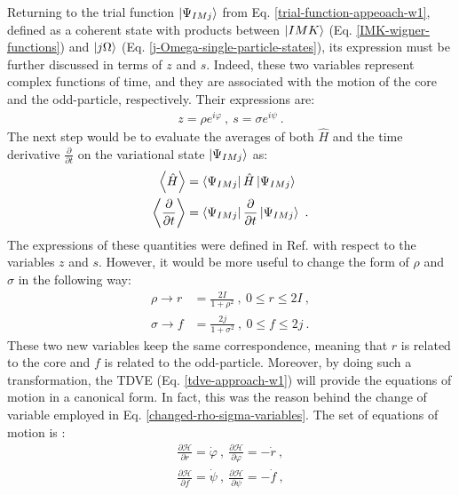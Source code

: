 Returning to the trial function $\ket{\Psi_{IMj}}$ from Eq. \ref{trial-function-appeoach-w1}, defined as a coherent state with products between  $\ket{IMK}$ (Eq. \ref{IMK-wigner-functions}) and $\ket{j\Omega}$ (Eq. \ref{j-Omega-single-particle-states}), its expression must be further discussed in terms of $z$ and $s$. Indeed, these two variables represent complex functions of time, and they are associated with the motion of the core and the odd-particle, respectively. Their expressions are:
\begin{align}
    z=\rho e^{i\varphi}\ ,\ s=\sigma e^{i\psi}\ .
    \label{z-s-variables}
\end{align}
The next step would be to evaluate the averages of both $\hat{H}$ and the time derivative $\frac{\partial}{\partial t}$ on the variational state $\ket{\Psi_{IMj}}$ as:
\begin{align}
    \left\langle \hat{H} \right\rangle&=\bra{\Psi_{IMj}}\hat{H}\ket{\Psi_{IMj}}\nonumber\\
    \left\langle \frac{\partial}{\partial t} \right\rangle&=\bra{\Psi_{IMj}}\frac{\partial}{\partial t}\ket{\Psi_{IMj}}\ .
    \label{hamiltonian-average}
\end{align}
The expressions of these quantities were defined in Ref. \cite{raduta2017semiclassical} with respect to the variables $z$ and $s$. However, it would be more useful to change the form of $\rho$ and $\sigma$ in the following way:
\begin{align}
    \rho \to r&=\frac{2I}{1+\rho^2}\ ,\ 0\leq r\leq 2I\ ,\nonumber\\
    \sigma \to f&=\frac{2j}{1+\sigma^2}\ ,\ 0\leq f\leq 2j\ .
    \label{changed-rho-sigma-variables}
\end{align}
These two new variables keep the same correspondence, meaning that $r$ is related to the core and $f$ is related to the odd-particle. Moreover, by doing such a transformation, the TDVE (Eq. \ref{tdve-approach-w1}) will provide the equations of motion in a canonical form. In fact, this was the reason behind the change of variable employed in Eq. \ref{changed-rho-sigma-variables}. The set of equations of motion is \cite{raduta2020approach}:
\begin{align}
    \frac{\partial \mathcal{H}}{\partial r}=\dot{\varphi}\ ,\ \frac{\partial \mathcal{H}}{\partial \varphi}=-\dot{r}\ ,\nonumber\\
    \frac{\partial \mathcal{H}}{\partial f}=\dot{\psi}\ ,\ \frac{\partial \mathcal{H}}{\partial \psi}=-\dot{f}\ ,
    \label{eq-of-motion-approach-w1}
\end{align}

